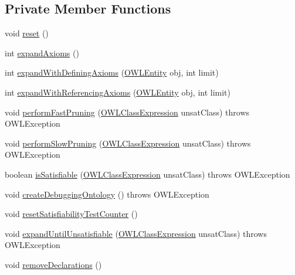 \subsection*{Private Member Functions}
\begin{DoxyCompactItemize}
\item 
void \hyperlink{classcom_1_1clarkparsia_1_1owlapi_1_1explanation_1_1_black_box_explanation_a8011db87224e4595158530c7b73da713}{reset} ()
\item 
int \hyperlink{classcom_1_1clarkparsia_1_1owlapi_1_1explanation_1_1_black_box_explanation_a16e2fbae82fba96146ad58298d783fca}{expand\-Axioms} ()
\item 
int \hyperlink{classcom_1_1clarkparsia_1_1owlapi_1_1explanation_1_1_black_box_explanation_adf2a66bc4a0bc3a714f976494961d57a}{expand\-With\-Defining\-Axioms} (\hyperlink{interfaceorg_1_1semanticweb_1_1owlapi_1_1model_1_1_o_w_l_entity}{O\-W\-L\-Entity} obj, int limit)
\item 
int \hyperlink{classcom_1_1clarkparsia_1_1owlapi_1_1explanation_1_1_black_box_explanation_a3305fa383696fc89f4e5efc740a7e33c}{expand\-With\-Referencing\-Axioms} (\hyperlink{interfaceorg_1_1semanticweb_1_1owlapi_1_1model_1_1_o_w_l_entity}{O\-W\-L\-Entity} obj, int limit)
\item 
void \hyperlink{classcom_1_1clarkparsia_1_1owlapi_1_1explanation_1_1_black_box_explanation_a9c80eed63bf0b90e4e8b69f4d8c10de0}{perform\-Fast\-Pruning} (\hyperlink{interfaceorg_1_1semanticweb_1_1owlapi_1_1model_1_1_o_w_l_class_expression}{O\-W\-L\-Class\-Expression} unsat\-Class)  throws O\-W\-L\-Exception 
\item 
void \hyperlink{classcom_1_1clarkparsia_1_1owlapi_1_1explanation_1_1_black_box_explanation_a54b914d48a7e62196e75da0befaa4b0c}{perform\-Slow\-Pruning} (\hyperlink{interfaceorg_1_1semanticweb_1_1owlapi_1_1model_1_1_o_w_l_class_expression}{O\-W\-L\-Class\-Expression} unsat\-Class)  throws O\-W\-L\-Exception 
\item 
boolean \hyperlink{classcom_1_1clarkparsia_1_1owlapi_1_1explanation_1_1_black_box_explanation_a1408e416e3754cc332d0a69066055a56}{is\-Satisfiable} (\hyperlink{interfaceorg_1_1semanticweb_1_1owlapi_1_1model_1_1_o_w_l_class_expression}{O\-W\-L\-Class\-Expression} unsat\-Class)  throws O\-W\-L\-Exception 
\item 
void \hyperlink{classcom_1_1clarkparsia_1_1owlapi_1_1explanation_1_1_black_box_explanation_a9a7ff8323b8fdf162a9e3534d39a143f}{create\-Debugging\-Ontology} ()  throws O\-W\-L\-Exception 
\item 
void \hyperlink{classcom_1_1clarkparsia_1_1owlapi_1_1explanation_1_1_black_box_explanation_ace8bb2b9bde7d58da672d6d2f2369f80}{reset\-Satisfiability\-Test\-Counter} ()
\item 
void \hyperlink{classcom_1_1clarkparsia_1_1owlapi_1_1explanation_1_1_black_box_explanation_ad7c20480618a1d6b41626994ba5417be}{expand\-Until\-Unsatisfiable} (\hyperlink{interfaceorg_1_1semanticweb_1_1owlapi_1_1model_1_1_o_w_l_class_expression}{O\-W\-L\-Class\-Expression} unsat\-Class)  throws O\-W\-L\-Exception 
\item 
void \hyperlink{classcom_1_1clarkparsia_1_1owlapi_1_1explanation_1_1_black_box_explanation_a697556a6fe7b562774ac65d105b5a9b9}{remove\-Declarations} ()
\end{DoxyCompactItemize}
